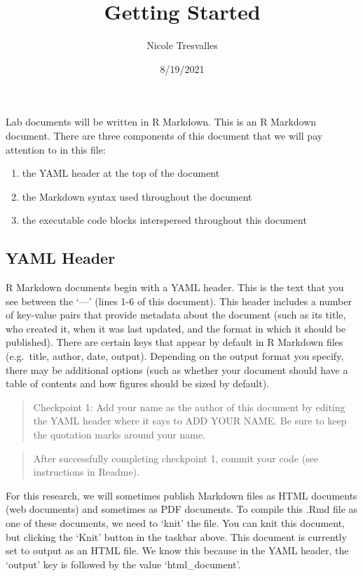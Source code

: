 \documentclass[
]{article}
\title{Getting Started}
\author{Nicole Tresvalles}
\date{8/19/2021}
\providecommand{\tightlist}{%
  \setlength{\itemsep}{0pt}\setlength{\parskip}{0pt}}
\begin{document}
\maketitle

Lab documents will be written in R Markdown. This is an R Markdown
document. There are three components of this document that we will pay
attention to in this file:

\begin{enumerate}
\def\labelenumi{\arabic{enumi}.}
\tightlist
\item
  the YAML header at the top of the document
\item
  the Markdown syntax used throughout the document
\item
  the executable code blocks interspersed throughout this document
\end{enumerate}

\hypertarget{yaml-header}{%
\subsection{YAML Header}\label{yaml-header}}

R Markdown documents begin with a YAML header. This is the text that you
see between the `---' (lines 1-6 of this document). This header includes
a number of key-value pairs that provide metadata about the document
(such as its title, who created it, when it was last updated, and the
format in which it should be published). There are certain keys that
appear by default in R Markdown files (e.g.~title, author, date,
output). Depending on the output format you specify, there may be
additional options (such as whether your document should have a table of
contents and how figures should be sized by default).

\begin{quote}
Checkpoint 1: Add your name as the author of this document by editing
the YAML header where it says to ADD YOUR NAME. Be sure to keep the
quotation marks around your name.
\end{quote}

\begin{quote}
After successfully completing checkpoint 1, commit your code (see
instructions in Readme).
\end{quote}

For this research, we will sometimes publish Markdown files as HTML
documents (web documents) and sometimes as PDF documents. To compile
this .Rmd file as one of these documents, we need to `knit' the file.
You can knit this document, but clicking the `Knit' button in the
taskbar above. This document is currently set to output as an HTML file.
We know this because in the YAML header, the `output' key is followed by
the value `html\_document'.
\end{document}
